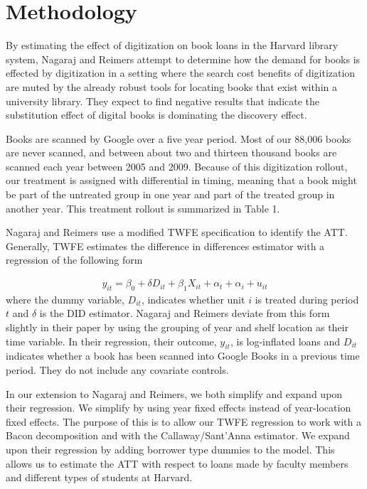 \documentclass{article}
\begin{document}
\section{Methodology}
By estimating the effect of digitization on book loans in the Harvard library system, Nagaraj and Reimers attempt to determine how the demand for books is effected by digitization in a setting where the search cost benefits of digitization are muted by the already robust tools for locating books that exist within a university library. They expect to find negative results that indicate the substitution effect of digital books is dominating the discovery effect. 

Books are scanned by Google over a five year period. Most of our 88,006 books are never scanned, and between about two and thirteen thousand books are scanned each year between 2005 and 2009. Because of this digitization rollout, our treatment is assigned with differential in timing, meaning that a book might be part of the untreated group in one year and part of the treated group in another year. This treatment rollout is summarized in Table 1.


Nagaraj and Reimers use a modified TWFE specification to identify the ATT.  Generally, TWFE estimates the difference in differences estimator with a regression of the following form

\begin{align}
	y_{it} = \beta_0 + \delta D_{it} + \beta_1X_{it} + \alpha_t  +  \alpha_i + u_{it}
\end{align}
where the dummy variable, $D_{it}$,  indicates whether unit $i$ is treated during period $t$ and $\delta$ is the DID estimator. Nagaraj and Reimers deviate from this form slightly in their paper by using the grouping of year and shelf location as their time variable. In their regression, their outcome, $y_{it}$, is log-inflated loans and $D_{it}$ indicates whether a book has been scanned into Google Books in a previous time period. They do not include any covariate controls. 

In our extension to Nagaraj and Reimers, we both simplify and expand upon their regression. We simplify by using year fixed effects instead of year-location fixed effects. The purpose of this is to allow our TWFE regression to work with a Bacon decomposition and with the Callaway/Sant'Anna estimator. We expand upon their regression by adding borrower type dummies to the model. This allows us to estimate the ATT with respect to loans made by faculty members and different types of students at Harvard. 
\end{document}
